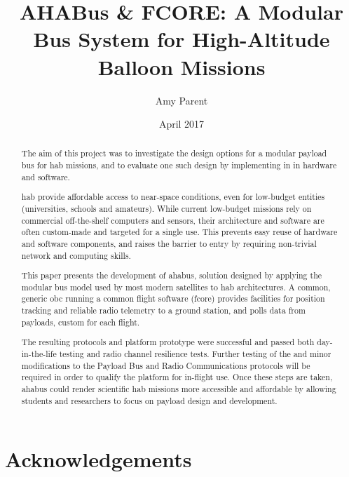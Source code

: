 \documentclass[11pt]{report}
\author{Amy Parent}
\title{AHABus \& FCORE: A Modular Bus System for High-Altitude Balloon Missions}
\date{April 2017}
\makeatletter
\newcommand\frontmatter{%
\cleardoublepage
\pagenumbering{roman}
}
\def\maketitle{%
    \vspace*{10em}
	\begin{center}%
	\let \footnote \thanks
        \vskip 5em%
		{\LARGE \textbf{\@title} \par}%
		\vskip 1.5em%
		{\large \@author}%
		\vskip 1em%
        {\large BSc (Hons) Computing - \@date\\} %
		\vskip 1em%
		{\normalsize School of Arts, Media and Games\\}%
		\vskip .1em%
		{\normalsize University of Abertay Dundee\\}%
		\vskip .1em%
		{\normalsize Dundee, DD1 1HG, UK}%
	\end{center}
}
\makeatother
\begin{document}
    
\frontmatter

\begin{titlepage}
\maketitle
\end{titlepage}

\begin{abstract}

The aim of this project was to investigate the design options for a modular payload bus for \acrfull{hab} missions, and to evaluate one such design by implementing in in hardware and software.

\acrlong{hab} provide affordable access to near-space conditions, even for low-budget entities (universities, schools and amateurs). While current low-budget missions rely on commercial off-the-shelf computers and sensors, their architecture and software are often custom-made and targeted for a single use. This prevents easy reuse of hardware and software components, and raises the barrier to entry by requiring non-trivial network and computing skills.

This paper presents the development of \acrfull{ahabus}, solution designed by applying the modular bus model used by most modern satellites to \acrlong{hab} architectures. A common, generic \acrfull{obc} running a common flight software (\acrshort{fcore}) provides facilities for position tracking and reliable radio telemetry to a ground station, and polls data from payloads, custom for each flight.

The resulting protocols and platform prototype were successful and passed both day-in-the-life testing and radio channel resilience tests. Further testing of the and minor modifications to the Payload Bus and Radio Communications protocols will be required in order to qualify the platform for in-flight use. Once these steps are taken, \acrshort{ahabus} could render scientific \acrlong{hab} missions more accessible and affordable by allowing students and researchers to focus on payload design and development.

\end{abstract}

\tableofcontents
\setlength{\parskip}{1em}

\listoffigures

\listoftables

\printglossary
\printglossary[type=\acronymtype]

\chapter*{Acknowledgements}
\end{document}
